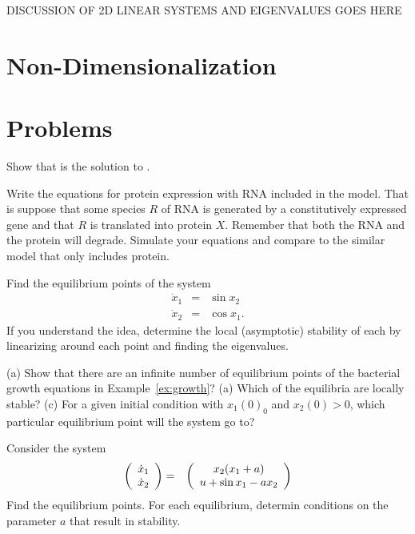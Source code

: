 DISCUSSION OF 2D LINEAR SYSTEMS AND EIGENVALUES GOES HERE

\section{Non-Dimensionalization}

\section{Problems}

\setcounter{exercount}{0}

\begin{exercise}
  Show that  is the solution to
  .
\end{exercise}

\begin{exercise} Write the equations for protein expression with RNA
  included in the model. That is suppose that some species $R$ of RNA
  is generated by a constitutively expressed gene and that $R$ is
  translated into protein $X$. Remember that both the RNA and the
  protein will degrade. Simulate your equations and compare to the
  similar model that only includes protein. 
\end{exercise}

\begin{exercise}
Find the equilibrium points of the system
%
\begin{eqnarray*}
\dot x_1 & = & \sin x_2 \\
\dot x_2 & = & \cos x_1 .
\end{eqnarray*}
%
If you understand the idea, determine the local (asymptotic) stability
of each by linearizing around each point and finding the eigenvalues.
\end{exercise}

\begin{exercise}
  (a) Show that there are an infinite number of equilibrium points of
  the bacterial growth equations in Example~\ref{ex:growth}? (a) Which
  of the equilibria are locally stable? (c) For a given initial
  condition with $x_1(0)_0$ and $x_2(0)>0$, which particular
  equilibrium point will the system go to?
\end{exercise}

\begin{exercise}
Consider the system
%
\begin{eqnarray*}
\left ( \begin{array}{c} \dot x_1 \\ \dot x_2 \end{array} \right ) & = & \left ( \begin{array}{c} x_2(x_1+a) \\ u+\sin x_1 - a x_2 \end{array} \right ) \\
\end{eqnarray*}
%
Find the equilibrium points. For each equilibrium, determin conditions
on the parameter $a$ that result in stability.
\end{exercise}

